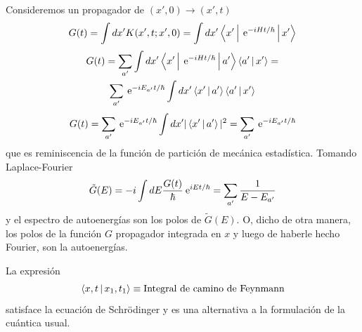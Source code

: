 \documentclass[10pt,oneside]{CBFT_book}
\begin{document}
Consideremos un propagador de $(x',0) \to (x',t)$
\[
	G(t) = \int dx' K(x',t ; x', 0) = \int dx' \Braket{x'|\:\mathrm{e}^{-i Ht/\hbar}|x'}
\]
\begin{multline*}
	G(t) = \sum_{a'} \int dx' \Braket{x'|\:\mathrm{e}^{-i Ht/\hbar}|a'}\Braket{a'|x'} = \\
		\sum_{a'} \:\mathrm{e}^{-i E_{a'}t/\hbar} \int dx' \Braket{x'|a'}\Braket{a'|x' } 
\end{multline*}
\[
	G(t) = \sum_{a'} \:\mathrm{e}^{-i E_{a'}t/\hbar} \int dx' |\Braket{x'|a'}|^2 = 
	\sum_{a'} \:\mathrm{e}^{-i E_{a'}t/\hbar} 
\]
que es reminiscencia de la función de partición de mecánica estadística. Tomando Laplace-Fourier 
\[
	\tilde{G}(E) = -i \int dE \frac{G(t)}{\hbar} \:\mathrm{e}^{i E t/\hbar} = \sum_{a'} \frac{1}{E-E_{a'}}
\]
y el espectro de autoenergías son los polos de $\tilde{G}(E)$.
O, dicho de otra manera, los polos de la función $G$ propagador integrada en $x$ y luego de
haberle hecho Fourier, son la autoenergías.


La expresión 
\[
	\Braket{x,t|x_1,t_1} \equiv \text{Integral de camino de Feynmann}
\]
satisface la ecuación de Schrödinger y es una alternativa a la formulación de la cuántica usual.


\end{document}
